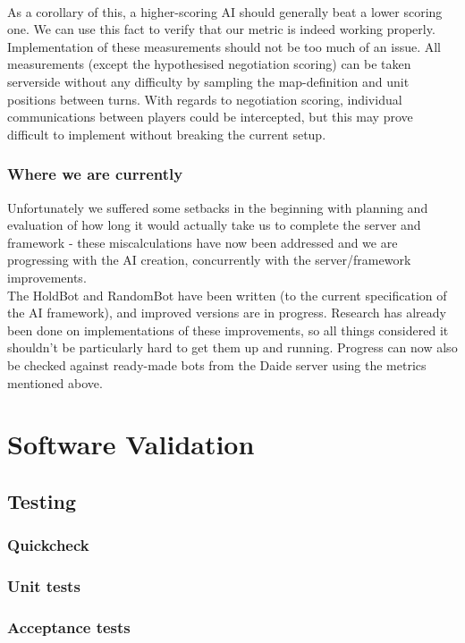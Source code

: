 \documentclass[12pt]{article}
\begin{document}
\\
As a corollary of this, a higher-scoring AI should generally beat a lower scoring one. We can use this fact to verify that our metric is indeed working properly. 
\\
Implementation of these measurements should not be too much of an issue. All measurements (except the hypothesised negotiation scoring) can be taken serverside without any difficulty by sampling the map-definition and unit positions between turns. With regards to negotiation scoring, individual communications between players could be intercepted, but this may prove difficult to implement without breaking the current setup.

\subsubsection{Where we are currently}
Unfortunately we suffered some setbacks in the beginning with planning and evaluation of how long it would actually take us to complete the server and framework - these miscalculations have now been addressed and we are progressing with the AI creation, concurrently with the server/framework improvements. 
\\
The HoldBot and RandomBot have been written (to the current specification of the AI framework), and improved versions are in progress. Research has already been done on implementations of these improvements, so all things considered it shouldn't be particularly hard to get them up and running. Progress can now also be checked against ready-made bots from the Daide server using the metrics mentioned above.

\section{Software Validation}
\subsection{Testing}
\subsubsection{Quickcheck}
\subsubsection{Unit tests}
\subsubsection{Acceptance tests}
\end{document}
